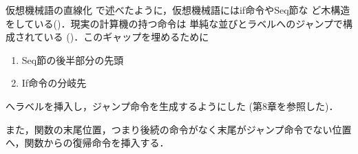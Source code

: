 \documentclass[a4paper,titlepage,report,disablejfam]{jsbook}
\begin{document}
\begin{resbonsiblesection}{仮想機械語の直線化}{\kobori}\label{sc:impl-basicblock}
 で述べたように，仮想機械語にはif命令やSeq節な
 ど木構造をしている()．現実の計算機の持つ命令は
 単純な並びとラベルへのジャンプで構成されている
 ()．このギャップを埋めるために
 \begin{enumerate}
  \item Seq節の後半部分の先頭
  \item If命令の分岐先
 \end{enumerate}
 へラベルを挿入し，ジャンプ命令を生成するようにした
 (\cite{Apeel:2009-10-30}第8章を参照した)．

 また，関数の末尾位置，つまり後続の命令がなく末尾がジャンプ命令でない位置
 へ，関数からの復帰命令を挿入する．


\end{resbonsiblesection}
\end{document}
